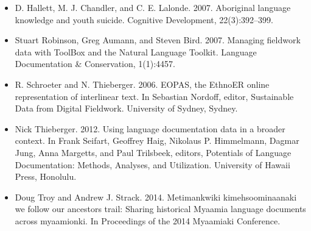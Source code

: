 \documentclass{beamer}
\begin{document}
\begin{frame}
\begin{itemize}
  \item D. Hallett, M. J. Chandler, and C. E. Lalonde. 2007. Aboriginal language knowledge and youth suicide. Cognitive Development, 22(3):392–399.
  \item Stuart Robinson, Greg Aumann, and Steven Bird. 2007. Managing fieldwork data with ToolBox and the Natural Language Toolkit. Language Documentation \& Conservation, 1(1):4457.
  \item R. Schroeter and N. Thieberger. 2006. EOPAS, the EthnoER online representation of interlinear text. In Sebastian Nordoff, editor, Sustainable Data from Digital Fieldwork. University of Sydney, Sydney.
  \item Nick Thieberger. 2012. Using language documentation data in a broader context. In Frank Seifart, Geoffrey Haig, Nikolaus P. Himmelmann, Dagmar Jung, Anna Margetts, and Paul Trilsbeek, editors, Potentials of Language Documentation: Methods, Analyses, and Utilization. University of Hawaii Press, Honolulu.
  \item Doug Troy and Andrew J. Strack. 2014. Metimankwiki kimehsoominaanaki we follow our ancestors trail: Sharing historical Myaamia language documents across myaamionki. In Proceedings of the 2014 Myaamiaki Conference.
\end{itemize}

\end{frame}
\end{document}
